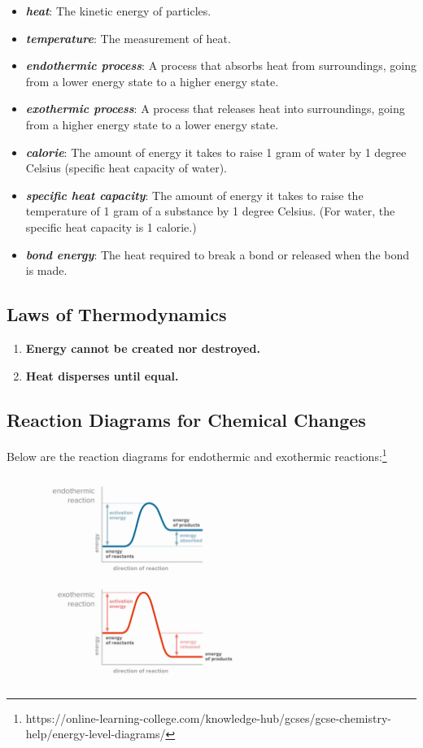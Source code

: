 \documentclass[a4paper, 12pt]{article}
\begin{document}
\begin{itemize}[leftmargin=*, nosep]
\item \textbf{\textit{heat}}: The kinetic energy of particles.
\item \textbf{\textit{temperature}}: The measurement of heat.
\item \textbf{\textit{endothermic process}}: A process that absorbs heat from surroundings, going from a lower energy state to a higher energy state.
\item \textbf{\textit{exothermic process}}: A process that releases heat into surroundings, going from a higher energy state to a lower energy state.
\item \textbf{\textit{calorie}}: The amount of energy it takes to raise 1 gram of water by 1 degree Celsius (specific heat capacity of water).
\item \textbf{\textit{specific heat capacity}}: The amount of energy it takes to raise the temperature of 1 gram of a substance by 1 degree Celsius. (For water, the specific heat capacity is 1 calorie.)
\item \textbf{\textit{bond energy}}: The heat required to break a bond or released when the bond is made.
\end{itemize}

\subsection{Laws of Thermodynamics}

\begin{enumerate}[leftmargin=*, nosep]
\item \textbf{Energy cannot be created nor destroyed.}
\item \textbf{Heat disperses until equal.}
\end{enumerate}

\subsection{Reaction Diagrams for Chemical Changes}
Below are the reaction diagrams for endothermic and exothermic reactions:\footnote{https://online-learning-college.com/knowledge-hub/gcses/gcse-chemistry-help/energy-level-diagrams/}

\begin{figure}[H]
\centering
\includegraphics[width=0.6\textwidth]{eldiag.jpg}
\end{figure}
\end{document}
